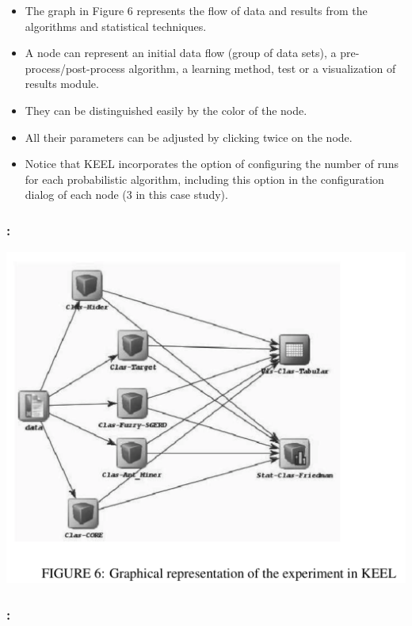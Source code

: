 \documentclass{beamer}
\begin{document}
\begin{CJK*}{UTF8}{bsmi}
\begin{frame}
	\begin{itemize}
		\item The graph in Figure 6 represents the flow of data and results from the algorithms and statistical techniques. 
		\item A node can represent an initial data flow (group of data sets), a pre-process/post-process algorithm, a learning method, test or a visualization of results module. 
		\item They can be distinguished easily by the color of the node. 
		\item All their parameters can be adjusted by clicking twice on the node. 
		\item Notice that KEEL incorporates the option of configuring the number of runs for each probabilistic algorithm, including this option in the configuration dialog of each node (3 in this case study).
	\end{itemize}
	
	
\end{frame}

\begin{frame}
	\frametitle{\insertsection : \insertsubsection}
	
	\begin{center}
		\includegraphics[width=.7\linewidth]{./8.png}
	\end{center}
\end{frame}


\begin{frame}
	\frametitle{\insertsection : \insertsubsection}
	

\end{frame}
\end{CJK*}
\end{document}
